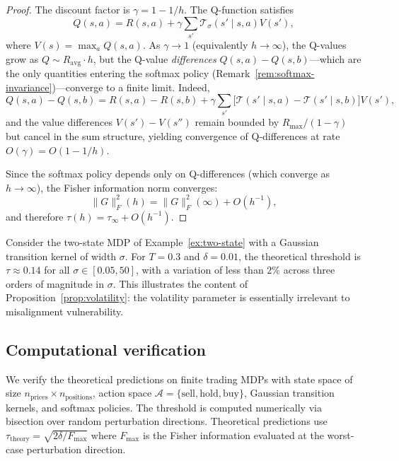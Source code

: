 \begin{proof}
The discount factor is $\gamma = 1 - 1/h$. The Q-function satisfies
\[
Q(s,a) = R(s,a) + \gamma \sum_{s'} \mathcal{T}_\sigma(s' \mid s, a) V(s'),
\]
where $V(s) = \max_a Q(s,a)$. As $\gamma \to 1$ (equivalently $h \to
\infty$), the Q-values grow as $Q \sim R_{\mathrm{avg}} \cdot h$, but the
Q-value \emph{differences} $Q(s,a) - Q(s,b)$---which are the only quantities
entering the softmax policy (Remark~\ref{rem:softmax-invariance})---converge
to a finite limit. Indeed,
\[
Q(s,a) - Q(s,b) = R(s,a) - R(s,b) + \gamma \sum_{s'} \bigl[\mathcal{T}(s'
  \mid s, a) - \mathcal{T}(s' \mid s, b)\bigr] V(s'),
\]
and the value differences $V(s') - V(s'')$ remain bounded by
$R_{\max}/(1-\gamma)$ but cancel in the sum structure, yielding convergence
of Q-differences at rate $O(\gamma) = O(1 - 1/h)$.

Since the softmax policy depends only on Q-differences (which converge as
$h \to \infty$), the Fisher information norm converges:
\[
\lVert G \rVert_F^2(h) = \lVert G \rVert_F^2(\infty) + O(h^{-1}),
\]
and therefore $\tau(h) = \tau_\infty + O(h^{-1})$.
\end{proof}

\begin{example}\label{ex:volatility}
Consider the two-state MDP of Example~\ref{ex:two-state} with a Gaussian
transition kernel of width $\sigma$. For $T = 0.3$ and $\delta = 0.01$, the
theoretical threshold is $\tau \approx 0.14$ for all $\sigma \in [0.05, 50]$,
with a variation of less than $2\%$ across three orders of magnitude in
$\sigma$. This illustrates the content of Proposition~\ref{prop:volatility}:
the volatility parameter is essentially irrelevant to misalignment
vulnerability.
\end{example}

\subsection{Computational verification}\label{sec:computation}

We verify the theoretical predictions on finite trading MDPs with state space
of size $n_{\mathrm{prices}} \times n_{\mathrm{positions}}$, action space
$\mathcal{A} = \{\text{sell}, \text{hold}, \text{buy}\}$, Gaussian transition
kernels, and softmax policies. The threshold is computed numerically via
bisection over random perturbation directions. Theoretical predictions use
$\tau_{\mathrm{theory}} = \sqrt{2\delta / F_{\max}}$ where $F_{\max}$ is the
Fisher information evaluated at the worst-case perturbation direction.


